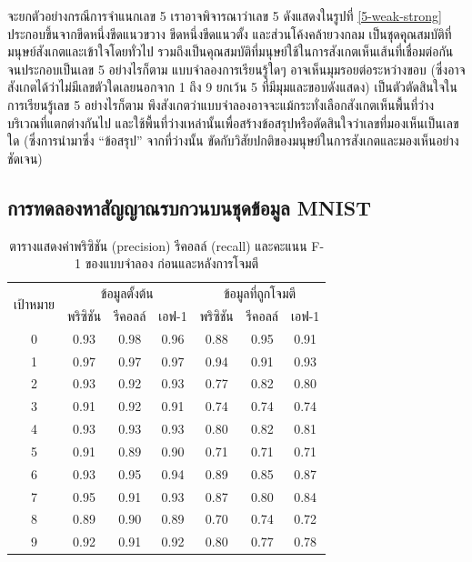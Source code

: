 \documentclass{cpepaper}
\begin{document}
จะยกตัวอย่างกรณีการจำแนกเลข 5 เราอาจพิจารณาว่าเลข 5 ดังแสดงในรูปที่ \ref{5-weak-strong} ประกอบขึ้นจากขีดหนึ่งขีดแนวขวาง ขีดหนึ่งขีดแนวตั้ง และส่วนโค้งคล้ายวงกลม เป็นชุดคุุณสมบัติที่มนุษย์สังเกตและเข้าใจโดยทั่วไป รวมถึงเป็นคุณสมบัติที่มนุษย์ใช้ในการสังเกตเห็นเส้นที่เชื่อมต่อกันจนประกอบเป็นเลข 5 อย่างไรก็ตาม แบบจำลองการเรียนรู้ใดๆ อาจเห็นมุมรอยต่อระหว่างขอบ (ซึ่งอาจสังเกตได้ว่าไม่มีเลขตัวใดเลยนอกจาก 1 ถึง 9 ยกเว้น 5 ที่มีมุมและขอบดังแสดง) เป็นตัวตัดสินใจในการเรียนรู้เลข 5 อย่างไรก็ตาม พึงสังเกตว่าแบบจำลองอาจจะแม้กระทั่งเลือกสังเกตเห็นพื้นที่ว่างบริเวณที่แตกต่างกันไป และใช้พื้นที่ว่างเหล่านั้นเพื่อสร้างข้อสรุปหรือตัดสินใจว่าเลขที่มองเห็นเป็นเลขใด (ซึ่งการนำมาซึ่ง ``ข้อสรุป'' จากที่ว่างนั้น ขัดกับวิสัยปกติของมนุษย์ในการสังเกตและมองเห็นอย่างชัดเจน)

\subsection{การทดลองหาสัญญาณรบกวนบนชุดข้อมูล MNIST}

\begin{table}
    \centering
    \begin{tabular}{c|ccc|ccc}
        \hline \hline
        \multirow{2}{*}{เป้าหมาย} & \multicolumn{3}{c|}{ข้อมูลตั้งต้น} & \multicolumn{3}{c}{ข้อมูลที่ถูกโจมตี}\\
        \cline{2-7}
        & พริซิชัน & รีคอลล์ & เอฟ-1 & พริซิชัน & รีคอลล์ & เอฟ-1 \\
        \hline
        0 & 0.93 & 0.98 & 0.96 & 0.88 & 0.95 & 0.91 \\
        1 & 0.97 & 0.97 & 0.97 & 0.94 & 0.91 & 0.93 \\
        2 & 0.93 & 0.92 & 0.93 & 0.77 & 0.82 & 0.80 \\
        3 & 0.91 & 0.92 & 0.91 & 0.74 & 0.74 & 0.74 \\
        4 & 0.93 & 0.93 & 0.93 & 0.80 & 0.82 & 0.81 \\
        5 & 0.91 & 0.89 & 0.90 & 0.71 & 0.71 & 0.71 \\
        6 & 0.93 & 0.95 & 0.94 & 0.89 & 0.85 & 0.87 \\
        7 & 0.95 & 0.91 & 0.93 & 0.87 & 0.80 & 0.84 \\
        8 & 0.89 & 0.90 & 0.89 & 0.70 & 0.74 & 0.72 \\
        9 & 0.92 & 0.91 & 0.92 & 0.80 & 0.77 & 0.78\\
        \hline \hline
    \end{tabular}
    \caption{ตารางแสดงค่าพริซิชัน (precision) รีคอลล์ (recall) และคะแนน F-1 ของแบบจำลอง ก่อนและหลังการโจมตี}
    \label{model-table}
\end{table}
\end{document}
